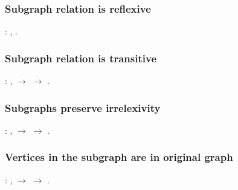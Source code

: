 \subsubsection{Subgraph relation is reflexive}


\begin{coqdoccode}
\coqdocnoindent
{}  : \coqdockw{\ensuremath{\forall}} ,   .\coqdoceol
 \coqdocemptyline
\end{coqdoccode}
\subsubsection{Subgraph relation is transitive}


\begin{coqdoccode}
\coqdocemptyline
\coqdocnoindent
{}  : \coqdockw{\ensuremath{\forall}}   ,    \ensuremath{\rightarrow}    \ensuremath{\rightarrow}   .\coqdoceol
 \coqdocemptyline
\end{coqdoccode}
\subsubsection{Subgraphs preserve irrelexivity}


\begin{coqdoccode}
\coqdocnoindent
{}  : \coqdockw{\ensuremath{\forall}}  ,    \ensuremath{\rightarrow}   \ensuremath{\rightarrow}  .\coqdoceol
 \coqdocemptyline
\end{coqdoccode}
\subsubsection{Vertices in the subgraph are in original graph}


\begin{coqdoccode}
\coqdocemptyline
\coqdocnoindent
{}  : \coqdockw{\ensuremath{\forall}}   ,    \ensuremath{\rightarrow}    \ensuremath{\rightarrow}   .\coqdoceol
 \coqdocemptyline
\end{coqdoccode}
